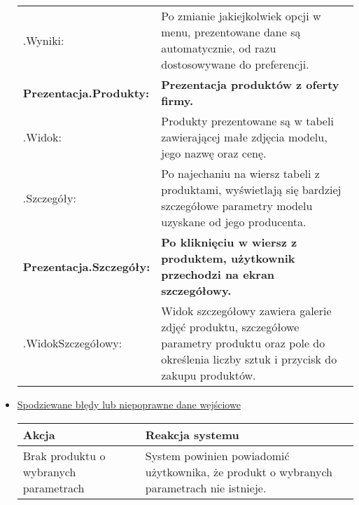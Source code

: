 \documentclass[a4paper,20pt]{article}
\begin{document}
\begin{itemize}
\begin{center}
\begin{tabularx}{\textwidth}[t]{XX}
\quad \quad .Wyniki: & 
\begin{minipage}[t]{\linewidth}%
Po zmianie jakiejkolwiek opcji w menu, prezentowane dane są automatycznie, od razu dostosowywane do preferencji.
\end{minipage}\\




\arrayrulecolor{black}\hline
\textbf{Prezentacja.Produkty:} & \textbf{Prezentacja produktów z oferty firmy.} \\

\hline

\quad .Widok: & 
\begin{minipage}[t]{\linewidth}%
Produkty prezentowane są w tabeli zawierającej małe zdjęcia modelu, jego nazwę oraz cenę.   
\end{minipage}\\


\quad .Szczegóły: & 
\begin{minipage}[t]{\linewidth}%
Po najechaniu na wiersz tabeli z produktami, wyświetlają się bardziej szczegółowe parametry modelu uzyskane od jego producenta.
\end{minipage}\\



\arrayrulecolor{black}\hline
\textbf{Prezentacja.Szczegóły:} & \textbf{Po kliknięciu w wiersz z produktem, użytkownik przechodzi na ekran szczegółowy.} \\
\hline

\quad .WidokSzczegółowy: & 
\begin{minipage}[t]{\linewidth}%
Widok szczegółowy zawiera galerie zdjęć produktu, szczegółowe parametry produktu oraz pole do określenia liczby sztuk i przycisk do zakupu produktów. 
\end{minipage}\\

\end{tabularx}
\end{center}


\item \underline{Spodziewane błędy lub niepoprawne dane wejściowe}


\begin{center}
\begin{tabular}{ | m{15em} | m{7cm} | } 
\hline
\textbf{Akcja} & \textbf{Reakcja systemu} \\ 
\hline
Brak produktu o wybranych parametrach & System powinien powiadomić użytkownika, że produkt o wybranych parametrach nie istnieje.  \\ 
\hline
\end{tabular}
\end{center}

\end{itemize}
\end{document}
